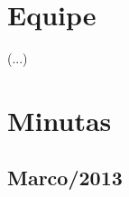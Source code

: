 \documentclass[12pt,a4paper]{article}
\begin{document}


\newpage%
\section{Equipe}

%
(...)

\newpage%
\section{Minutas}

\subsection{Marco/2013}
  

%   
%   
%   
%   
%   

%   
%   
%   
% 
%   
%   
%   
%   
% 
%   
%   
%   
% 


\end{document}
